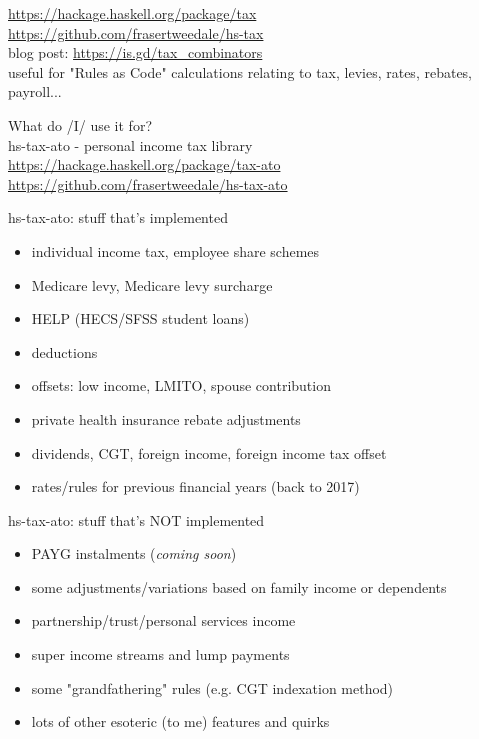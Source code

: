 \documentclass[ignorenonframetext,aspectratio=169,12pt]{beamer}
\begin{document}
\begin{frame}[plain]
\Large
\center
\ttfamily
\url{https://hackage.haskell.org/package/tax}\\
\bigskip
\url{https://github.com/frasertweedale/hs-tax}\\
\bigskip
blog post: \url{https://is.gd/tax_combinators}\\
\bigskip
\bigskip
useful for "Rules as Code" calculations relating to tax, levies,
rates, rebates, payroll...

\end{frame}



\begin{frame}[plain]
\Large
\center
\ttfamily
What do /I/ use it for?\\
\bigskip
hs-tax-ato - personal income tax library\\
\bigskip
\url{https://hackage.haskell.org/package/tax-ato}\\
\bigskip
\url{https://github.com/frasertweedale/hs-tax-ato}

\end{frame}

\begin{frame}{hs-tax-ato: stuff that's implemented}
\begin{itemize}
  \item individual income tax, employee share schemes
  \item Medicare levy, Medicare levy surcharge
  \item HELP (HECS/SFSS student loans)
  \item deductions
  \item offsets: low income, LMITO, spouse contribution
  \item private health insurance rebate adjustments
  \item dividends, CGT, foreign income, foreign income tax offset
  \item rates/rules for previous financial years (back to 2017)
\end{itemize}
\end{frame}

\begin{frame}{hs-tax-ato: stuff that's NOT implemented}
\begin{itemize}
  \item PAYG instalments ({\em coming soon})
  \item some adjustments/variations based on family income or dependents
  \item partnership/trust/personal services income
  \item super income streams and lump payments
  \item some "grandfathering" rules (e.g. CGT indexation method)
  \item lots of other esoteric (to me) features and quirks
\end{itemize}
\end{frame}
\end{document}
